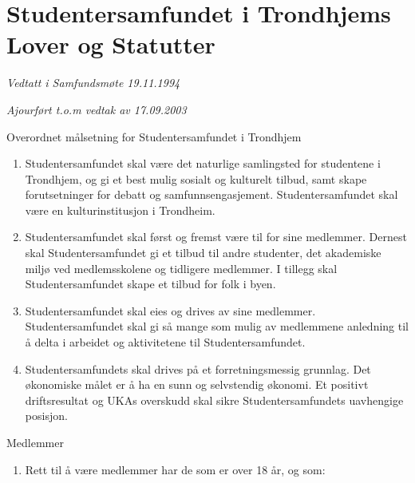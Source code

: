 
\chapter*{Studentersamfundet i Trondhjems Lover og Statutter}

\emph{Vedtatt i Samfundsmøte 19.11.1994}

\emph{Ajourført t.o.m vedtak av 17.09.2003}



\begin{lovkapittel}{}

\begin{lovparagraf}{Overordnet målsetning for Studentersamfundet i Trondhjem}

    \begin{enumerate}
        \item Studentersamfundet skal være det naturlige samlingsted for studentene i Trondhjem, og gi
            et best mulig sosialt og kulturelt tilbud, samt skape forutsetninger for debatt og
            samfunnsengasjement. Studentersamfundet skal være en kulturinstitusjon i Trondheim.
        \item Studentersamfundet skal først og fremst være til for sine medlemmer. Dernest
            skal Studentersamfundet gi et tilbud til andre studenter, det akademiske miljø
            ved medlemsskolene og tidligere medlemmer. I tillegg skal Studentersamfundet
            skape et tilbud for folk i byen.
	\item Studentersamfundet skal eies og drives av sine medlemmer. Studentersamfundet skal gi så mange som mulig 
	av medlemmene anledning til å delta i arbeidet og aktivitetene til Studentersamfundet.
	\item Studentersamfundets skal drives på et forretningsmessig grunnlag. Det økonomiske målet er å ha en sunn og 
	selvstendig økonomi. Et positivt driftsresultat og UKAs overskudd skal sikre Studentersamfundets
	uavhengige posisjon.

    \end{enumerate}
\end{lovparagraf}





\begin{lovparagraf}{Medlemmer}

  \begin{enumerate}
    \item Rett til å være medlemmer har de som er over 18 år, og som:
      

\end{enumerate}
\end{lovparagraf}
\end{lovkapittel}
